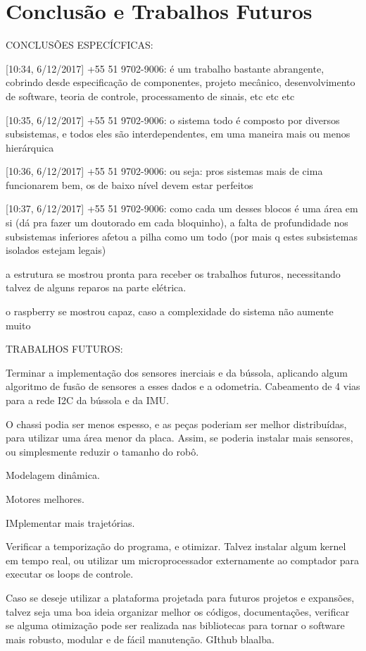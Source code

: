 \section{Conclusão e Trabalhos Futuros}
\label{sec:conclusao}

CONCLUSÕES ESPECÍCFICAS:

[10:34, 6/12/2017] +55 51 9702-9006: é um trabalho bastante abrangente, cobrindo desde especificação de componentes, projeto mecânico, desenvolvimento de software, teoria de controle, processamento de sinais, etc etc etc

[10:35, 6/12/2017] +55 51 9702-9006: o sistema todo é composto por diversos subsistemas, e todos eles são interdependentes, em uma maneira mais ou menos hierárquica

[10:36, 6/12/2017] +55 51 9702-9006: ou seja: pros sistemas mais de cima funcionarem bem, os de baixo nível devem estar perfeitos

[10:37, 6/12/2017] +55 51 9702-9006: como cada um desses blocos é uma área em si (dá pra fazer um doutorado em cada bloquinho), a falta de profundidade nos subsistemas inferiores afetou a pilha como um todo (por mais q estes subsistemas isolados estejam legais)

a estrutura se mostrou pronta para receber os trabalhos futuros, necessitando talvez de alguns reparos na parte elétrica.

o raspberry se mostrou capaz, caso a complexidade do sistema não aumente muito

TRABALHOS FUTUROS:

Terminar a implementação dos sensores inerciais e da bússola, aplicando algum algoritmo de fusão de sensores a esses dados e a odometria. Cabeamento de 4 vias para a rede I2C da bússola e da IMU.

O chassi podia ser menos espesso, e as peças poderiam ser melhor distribuídas, para utilizar uma área menor da placa. Assim, se poderia instalar mais sensores, ou simplesmente reduzir o tamanho do robô.

Modelagem dinâmica.

Motores melhores.

IMplementar mais trajetórias.

Verificar a temporização do programa, e otimizar. Talvez instalar algum kernel em tempo real, ou utilizar um microprocessador externamente ao comptador para executar os loops de controle.

Caso se deseje utilizar a plataforma projetada para futuros projetos e expansões, talvez seja uma boa ideia organizar melhor os códigos, documentações, verificar se alguma otimização pode ser realizada nas bibliotecas para tornar o software mais robusto, modular e de fácil manutenção. GIthub blaalba.


